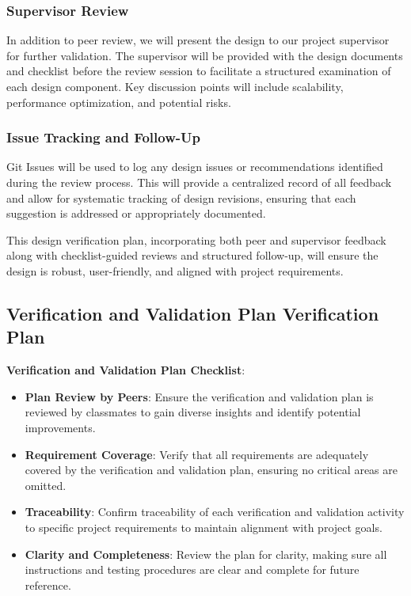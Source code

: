 \documentclass[12pt, titlepage]{article}
\begin{document}
\subsubsection*{Supervisor Review}
In addition to peer review, we will present the design to our project supervisor for further validation. The supervisor will be provided with the design documents and checklist before the review session to facilitate a structured examination of each design component. Key discussion points will include scalability, performance optimization, and potential risks. 

\subsubsection*{Issue Tracking and Follow-Up}
Git Issues will be used to log any design issues or recommendations identified during the review process. This will provide a centralized record of all feedback and allow for systematic tracking of design revisions, ensuring that each suggestion is addressed or appropriately documented.

This design verification plan, incorporating both peer and supervisor feedback along with checklist-guided reviews and structured follow-up, will ensure the design is robust, user-friendly, and aligned with project requirements.


\subsection{Verification and Validation Plan Verification Plan}

\textbf{Verification and Validation Plan Checklist}:

\begin{itemize}
    \item \textbf{Plan Review by Peers}: Ensure the verification and validation plan is reviewed by classmates to gain diverse insights and identify potential improvements.
    \item \textbf{Requirement Coverage}: Verify that all requirements are adequately covered by the verification and validation plan, ensuring no critical areas are omitted.
    \item \textbf{Traceability}: Confirm traceability of each verification and validation activity to specific project requirements to maintain alignment with project goals.
    \item \textbf{Clarity and Completeness}: Review the plan for clarity, making sure all instructions and testing procedures are clear and complete for future reference.
\end{itemize}
\end{document}
